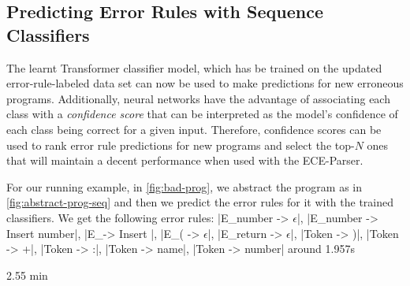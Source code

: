 \subsection{Predicting Error Rules with Sequence Classifiers}
\label{sec:overview:seq-classifiers}
The learnt Transformer classifier model, which has be trained on the updated
error-rule-labeled data set can now be used to make predictions for new
erroneous programs. Additionally, neural networks have the advantage of
associating each class with a \emph{confidence score} that can be interpreted as
the model's confidence of each class being correct for a given input. Therefore,
confidence scores can be used to rank error rule predictions for new programs
and select the top-$N$ ones that will maintain a decent performance when used
with the ECE-Parser.

For our running example, in \autoref{fig:bad-prog}, we abstract the program as
in \autoref{fig:abstract-prog-seq} and then we predict the error rules for it
with the trained classifiers. We get the following error rules:
%
|E_number -> $\epsilon$|, |E_number -> Insert number|, |E_\n -> Insert \n|,
%
|E_( -> $\epsilon$|, |E_return -> $\epsilon$|, |Token -> )|, |Token -> +|,
%
|Token -> :|, |Token -> name|, |Token -> number| around 1.957s

2.55 min
